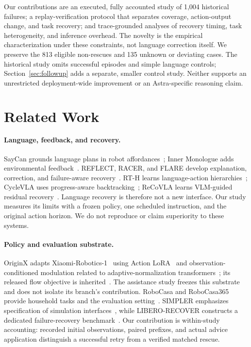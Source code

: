 \documentclass[10pt,twocolumn,letterpaper]{article}
\begin{document}
Our contributions are an executed, fully accounted study of 1,004 historical failures; a replay-verification protocol that separates coverage, action-output change, and task recovery; and trace-grounded analyses of recovery timing, task heterogeneity, and inference overhead. The novelty is the empirical characterization under these constraints, not language correction itself. We preserve the 813 eligible non-rescues and 135 unknown or deviating cases. The historical study omits successful episodes and simple language controls; Section~\ref{sec:followup} adds a separate, smaller control study. Neither supports an unrestricted deployment-wide improvement or an Astra-specific reasoning claim.

\section{Related Work}
\label{sec:related}
\paragraph{Language, feedback, and recovery.}
SayCan grounds language plans in robot affordances~\cite{saycan}; Inner Monologue adds environmental feedback~\cite{innermonologue}. REFLECT, RACER, and FLARE develop explanation, correction, and failure-aware recovery~\cite{reflect,racer,flare}. RT-H learns language-action hierarchies~\cite{rth}; CycleVLA uses progress-aware backtracking~\cite{cyclevla}; ReCoVLA learns VLM-guided residual recovery~\cite{recovla}. Language recovery is therefore not a new interface. Our study measures its limits with a frozen policy, one scheduled instruction, and the original action horizon. We do not reproduce or claim superiority to these systems.

\paragraph{Policy and evaluation substrate.}
OriginX adapts Xiaomi-Robotics-1~\cite{xiaomi} using Action LoRA~\cite{lora} and observation-conditioned modulation related to adaptive-normalization transformers~\cite{dit}; its released flow objective is inherited~\cite{flow}. The assistance study freezes this substrate and does not isolate its branch's contribution. RoboCasa and RoboCasa365 provide household tasks and the evaluation setting~\cite{robocasa,robocasa365,protocol}. SIMPLER emphasizes specification of simulation interfaces~\cite{simpler}, while LIBERO-RECOVER constructs a dedicated failure-recovery benchmark~\cite{liberorecover}. Our contribution is within-study accounting: recorded initial observations, paired prefixes, and actual advice application distinguish a successful retry from a verified matched rescue.
\end{document}
